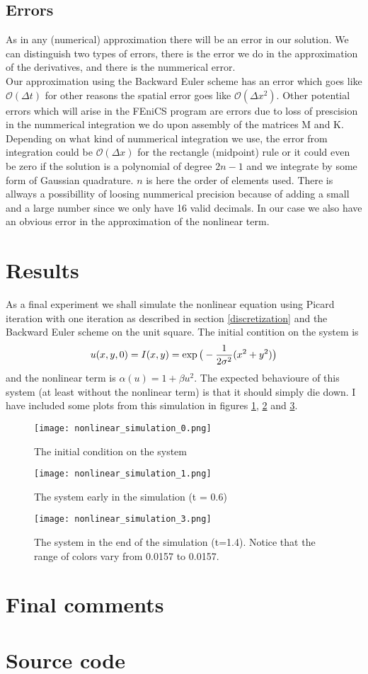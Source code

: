 \documentclass[a4paper,english, 10pt, twoside]{article}
\begin{document}
\subsection{Errors}
As in any (numerical) approximation there will be an error in our solution. We can distinguish two types of errors, there is the error we do in 
the approximation of the derivatives, and there is the nummerical error.\\
Our approximation using the Backward Euler scheme has an error which goes like $\mathcal{O}(\Delta t)$ for other reasons the spatial error goes 
like $\mathcal{O}(\Delta x^2)$. Other potential errors which will arise in the FEniCS program are errors due to loss of prescision in the 
nummerical integration we do upon assembly of the matrices M and K. Depending on what kind of nummerical integration we use, the error from integration 
could be $\mathcal{O}(\Delta x)$ for the rectangle (midpoint) rule or it could even be zero if the solution is a polynomial of degree $2n-1$ 
and we integrate by some form of Gaussian quadrature. $n$ is here the order of elements used.
There is allways a possibillity of loosing nummerical precision because of adding a small and a large number since we only have 16 valid decimals.
In our case we also have an obvious error in the approximation of the nonlinear term. 

\section{Results}
As a final experiment we shall simulate the nonlinear equation using Picard iteration with one iteration as described in section 
\ref{discretization} and the Backward Euler scheme on the unit square. The initial contition on the system is
\begin{equation}
 u(x,y,0) = I(x,y)=\exp\big(-{1\over2\sigma^2}(x^2+y^2)\big)
\end{equation}
and the nonlinear term is $\alpha(u) = 1+\beta u^2$. The expected behavioure of this system (at least without the nonlinear term) is that it 
should simply die down. I have included some plots from this simulation in figures \ref{simulation_1}, \ref{simulation_2} and \ref{simulation_3}.
\begin{figure}[H]
\centering
\texttt{[image: nonlinear\_simulation\_0.png]}
\caption{The initial condition on the system}
\label{simulation_1}
\end{figure}
\begin{figure}[H]
\centering
\texttt{[image: nonlinear\_simulation\_1.png]}
\caption{The system early in the simulation (t = 0.6)}
\label{simulation_2}
\end{figure}
\begin{figure}[H]
\centering
\texttt{[image: nonlinear\_simulation\_3.png]}
\caption{The system in the end of the simulation (t=1.4). Notice that the range of colors vary from 0.0157 to 0.0157.}
\label{simulation_3}
\end{figure}
\section{Final comments}
\appendix
\section{Source code}

\end{document}
